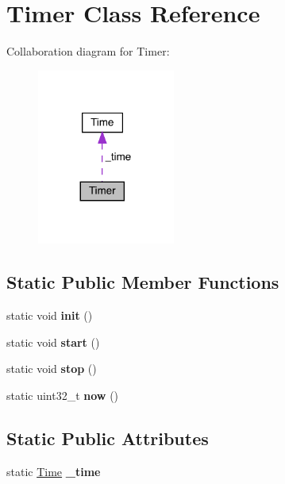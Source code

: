 \hypertarget{classTimer}{}\section{Timer Class Reference}
\label{classTimer}


Collaboration diagram for Timer\+:\nopagebreak
\begin{figure}[H]
\begin{center}
\leavevmode
\includegraphics[width=128pt]{classTimer__coll__graph}
\end{center}
\end{figure}
\subsection*{Static Public Member Functions}
\begin{DoxyCompactItemize}
\item 
\mbox{\label{classTimer_a00eca12a53538b339a927723a246e2d7}} 
static void {\bfseries init} ()
\item 
\mbox{\label{classTimer_a3a8b5272198d029779dc9302a54305a8}} 
static void {\bfseries start} ()
\item 
\mbox{\label{classTimer_a63f0eb44b27402196590a03781515dba}} 
static void {\bfseries stop} ()
\item 
\mbox{\label{classTimer_a8b32de7275bebb6ecc51385f1f1d1d43}} 
static uint32\+\_\+t {\bfseries now} ()
\end{DoxyCompactItemize}
\subsection*{Static Public Attributes}
\begin{DoxyCompactItemize}
\item 
\mbox{\label{classTimer_a831586e44562c0ea423344197dc8e529}} 
static \mbox{\hyperlink{structTime}{Time}} {\bfseries \+\_\+time}
\end{DoxyCompactItemize}
